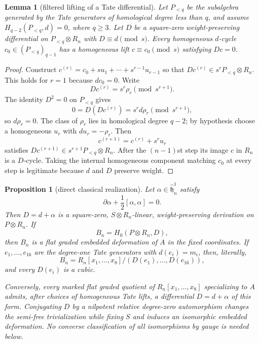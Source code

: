 \documentclass[11pt]{article}
\newtheorem{lemma}[theorem]{Lemma}
\newtheorem{proposition}[theorem]{Proposition}
\theoremstyle{definition}
\theoremstyle{remark}
\begin{document}
\begin{lemma}[filtered lifting of a Tate differential]\label{lem:cyclelift}
Let $P_{<q}$ be the subalgebra generated by the Tate generators of
homological degree less than $q$, and assume
$H_{q-2}(P_{<q},d)=0$, where $q\geq3$.  Let $D$ be a square-zero
weight-preserving differential on $P_{<q}\otimes R_n$ with
$D\equiv d\pmod s$.  Every homogeneous $d$-cycle
$c_0\in(P_{<q})_{q-1}$ has a homogeneous lift
$c\equiv c_0\pmod s$ satisfying $Dc=0$.
\end{lemma}

\begin{proof}
Construct
\(
 c^{(r)}=c_0+su_1+\cdots+s^{r-1}u_{r-1}
\)
so that $Dc^{(r)}\in s^rP_{<q}\otimes R_n$.  This holds for $r=1$
because $dc_0=0$.  Write
\[
 Dc^{(r)}=s^r\rho_r\pmod {s^{r+1}}.
\]
The identity $D^2=0$ on $P_{<q}$ gives
\[
 0=D(Dc^{(r)})=s^rd\rho_r\pmod {s^{r+1}},
\]
so $d\rho_r=0$.  The class of $\rho_r$ lies in homological degree $q-2$;
by hypothesis choose a homogeneous $u_r$ with $du_r=-\rho_r$.  Then
\[
 c^{(r+1)}=c^{(r)}+s^ru_r
\]
satisfies $Dc^{(r+1)}\in s^{r+1}P_{<q}\otimes R_n$.  After the
$(n-1)$st step its image $c$ in $R_n$ is a $D$-cycle.  Taking the internal
homogeneous component matching $c_0$ at every step is legitimate because
$d$ and $D$ preserve weight.
\end{proof}

\begin{proposition}[direct classical realization]\label{prop:realization}
Let $\alpha\in\widehat{\mathfrak h}_n^1$ satisfy
\[
 \partial\alpha+\frac12[\alpha,\alpha]=0.                   \tag{2.8}
\]
Then $D=d+\alpha$ is a square-zero, $S\otimes R_n$-linear,
weight-preserving derivation on $P\otimes R_n$.  If
\[
 B_n=H_0(P\otimes R_n,D),
\]
then $B_n$ is a flat graded embedded deformation of $A$ in the fixed
coordinates.  If $e_1,\ldots,e_{16}$ are the degree-one Tate generators with
$d(e_i)=m_i$, then, literally,
\[
 B_n=R_n[x_1,\ldots,x_8]/(D(e_1),\ldots,D(e_{16})),           \tag{2.9}
\]
and every $D(e_i)$ is a cubic.

Conversely, every marked flat graded quotient of $R_n[x_1,\ldots,x_8]$
specializing to $A$ admits, after choices of homogeneous Tate lifts, a
differential $D=d+\alpha$ of this form.  Conjugating $D$ by a nilpotent
relative degree-zero automorphism changes the semi-free trivialization while
fixing $S$ and induces an isomorphic embedded deformation.  No converse
classification of all isomorphisms by gauge is needed below.
\end{proposition}
\end{document}
